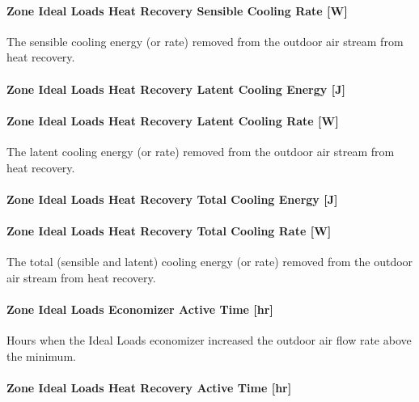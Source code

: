 \paragraph{Zone Ideal Loads Heat Recovery Sensible Cooling Rate {[}W{]}}\label{zone-ideal-loads-heat-recovery-sensible-cooling-rate-w}

The sensible cooling energy (or rate) removed from the outdoor air stream from heat recovery.

\paragraph{Zone Ideal Loads Heat Recovery Latent Cooling Energy {[}J{]}}\label{zone-ideal-loads-heat-recovery-latent-cooling-energy-j}

\paragraph{Zone Ideal Loads Heat Recovery Latent Cooling Rate {[}W{]}}\label{zone-ideal-loads-heat-recovery-latent-cooling-rate-w}

The latent cooling energy (or rate) removed from the outdoor air stream from heat recovery.

\paragraph{Zone Ideal Loads Heat Recovery Total Cooling Energy {[}J{]}}\label{zone-ideal-loads-heat-recovery-total-cooling-energy-j}

\paragraph{Zone Ideal Loads Heat Recovery Total Cooling Rate {[}W{]}}\label{zone-ideal-loads-heat-recovery-total-cooling-rate-w}

The total (sensible and latent) cooling energy (or rate) removed from the outdoor air stream from heat recovery.

\paragraph{Zone Ideal Loads Economizer Active Time {[}hr{]}}\label{zone-ideal-loads-economizer-active-time-hr}

Hours when the Ideal Loads economizer increased the outdoor air flow rate above the minimum.

\paragraph{Zone Ideal Loads Heat Recovery Active Time {[}hr{]}}\label{zone-ideal-loads-heat-recovery-active-time-hr}

